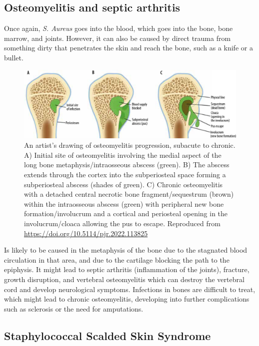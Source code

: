 \subsection{Osteomyelitis and septic arthritis}

Once again, \textit{S. Aureus} goes into the blood, which goes into the bone, bone marrow, and joints. However, it can also be caused by direct trauma from something dirty that penetrates the skin and reach the bone, such as a knife or a bullet.

    \begin{figure}[h]
        \centering
            \includegraphics[width=0.7\linewidth]{figures/Staph/PJR-87-46472-g022.jpg} 
        \caption{An artist’s drawing of osteomyelitis progression, subacute to chronic. A) Initial site of osteomyelitis involving the medial aspect of the long bone metaphysis/intraosseous abscess (green). B) The abscess extends through the cortex into the subperiosteal space forming a subperiosteal abscess (shades of green). C) Chronic osteomyelitis with a detached central necrotic bone fragment/sequestrum (brown) within the intraosseous abscess (green) with peripheral new bone formation/involucrum and a cortical and periosteal opening in the involucrum/cloaca allowing the pus to escape. Reproduced from \url{ https://doi.org/10.5114/pjr.2022.113825}}
        \label{figure:osteomyelitis}
    \end{figure}

Is likely to be caused in the metaphysis of the bone due to the stagnated blood circulation in that area, and due to the cartilage blocking the path to the epiphysis. It might lead to septic arthritis (inflammation of the joints), fracture, growth disruption, and vertebral osteomyelitis which can destroy the vertebral cord and develop neurological symptoms. Infections in bones are difficult to treat, which might lead to chronic osteomyelitis, developing into further complications such as sclerosis or the need for amputations.


\subsection{Staphylococcal Scalded Skin Syndrome}

